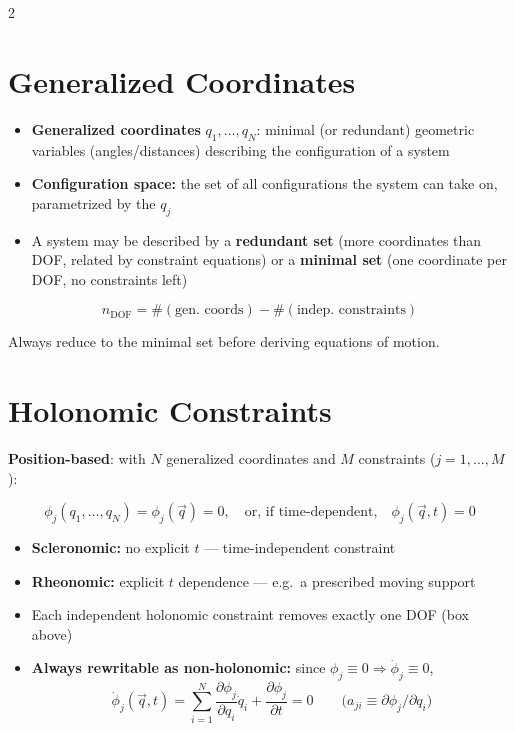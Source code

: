 \documentclass[10pt]{article}
\begin{document}
\begin{multicols}{2}
\section*{Generalized Coordinates}
\begin{itemize}[nosep, leftmargin=1.1em]
    \item \textbf{Generalized coordinates} $q_1,\dots,q_N$: minimal (or redundant) geometric variables (angles/distances) describing the configuration of a system
    \item \textbf{Configuration space:} the set of all configurations the system can take on, parametrized by the $q_j$
    \item A system may be described by a \textbf{redundant set} (more coordinates than DOF, related by constraint equations) or a \textbf{minimal set} (one coordinate per DOF, no constraints left)
\end{itemize}
\begin{keybox}
\[
    n_{\text{DOF}} = \#(\text{gen.\ coords}) - \#(\text{indep.\ constraints})
\]
\end{keybox}
Always reduce to the minimal set before deriving equations of motion.

\section*{Holonomic Constraints}
\textbf{Position-based}: with $N$ generalized coordinates and $M$ constraints ($j=1,\dots,M$):
\begin{keybox}
\[
    \phi_j(q_1,\dots,q_N)=\phi_j(\vec q)=0, \quad\text{or, if time-dependent,}\quad \phi_j(\vec q,t)=0
\]
\end{keybox}
\begin{itemize}[nosep, leftmargin=1.1em]
    \item \textbf{Scleronomic:} no explicit $t$ --- time-independent constraint
    \item \textbf{Rheonomic:} explicit $t$ dependence --- e.g.\ a prescribed moving support
    \item Each independent holonomic constraint removes exactly one DOF (box above)
    \item \textbf{Always rewritable as non-holonomic:} since $\phi_j\equiv0\Rightarrow\dot\phi_j\equiv0$,
    \[
        \dot\phi_j(\vec q,t)=\sum_{i=1}^{N}\frac{\partial\phi_j}{\partial q_i}\dot q_i+\frac{\partial\phi_j}{\partial t}=0
        \qquad\big(a_{ji}\equiv\partial\phi_j/\partial q_i\big)
    \]
\end{itemize}


\end{multicols}
\end{document}
